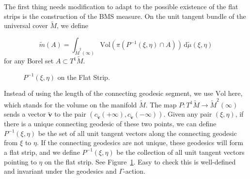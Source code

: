\documentclass[reqno,11pt]{article}
\theoremstyle{definition}
\theoremstyle{remark}
\numberwithin{equation}{section}
\begin{document}
The first thing needs modification to adapt to the possible existence of the flat strips is the construction of the BMS measure. On the unit tangent bundle of the universal cover $\widetilde{M}$, we define   

\begin{displaymath}
	\widetilde{m}(A)=\int_{\widetilde{M}^2(\infty)}\text{Vol}(\pi(P^{-1}(\xi,\eta)\cap A))\,\mathrm{d}\widetilde{\mu}(\xi,\eta)
\end{displaymath}
for any Borel set $A\subset T^1\widetilde{M}$.

\begin{figure}[htbp]
	\centering
	\caption{$P^{-1}(\xi,\eta)$ on the Flat Strip.}\label{fig8}
\end{figure}

Instead of using the length of the connecting geodesic segment, we use $\text{Vol}$ here, which stands for the volume on the manifold $\widetilde{M}$. The map $P:T^1\widetilde{M}\to\widetilde{M}^2(\infty)$ sends a vector $\bm{\widetilde{v}}$ to the pair $(c_{\bm{\widetilde{v}}}(+\infty),c_{\bm{\widetilde{v}}}(-\infty))$. Given any pair $(\xi,\eta)$, if there is a unique connecting geodesic of these two points, we can define $P^{-1}(\xi,\eta)$ be the set of all unit tangent vectors along the connecting geodesic from $\xi$ to $\eta$. If the connecting geodesics are not unique, these geodesics will form a flat strip, and we define $P^{-1}(\xi,\eta)$ be the collection of all unit tangent vectors pointing to $\eta$ on the flat strip. See Figure~\ref{fig8}. Easy to check this is well-defined and invariant under the geodesics and $\Gamma$-action.  
\end{document}
